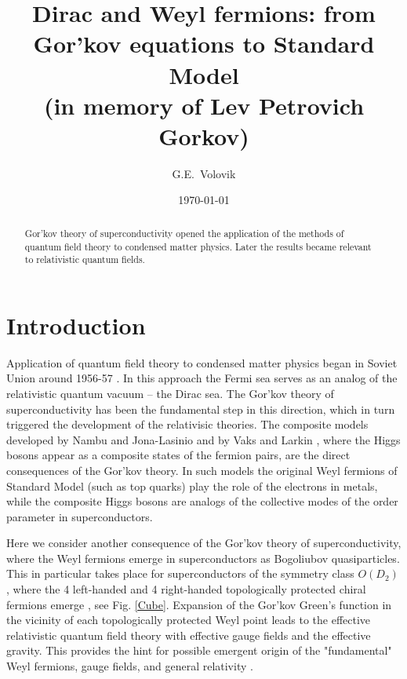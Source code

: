 \documentclass[prb,
superscriptaddress,showpacs,amsmath,amssymb]{revtex4}
\begin{document}
\title{Dirac and Weyl fermions: from Gor'kov equations to Standard Model\\
(in memory of Lev Petrovich Gorkov)}

\author{G.E.~Volovik}


\date{\today}


\begin{abstract}
Gor'kov theory of superconductivity \cite{Gorkov1958} opened the application of the methods of quantum field theory to condensed matter physics. Later the results became relevant to relativistic quantum fields.
\end{abstract} 



\maketitle

 
 \section{Introduction}

Application of quantum field theory to condensed matter physics  began in Soviet Union  around 1956-57
\cite{Gorkov2011}. In this approach the Fermi sea serves as an analog of the relativistic quantum vacuum -- the Dirac sea. The Gor'kov theory of superconductivity  \cite{Gorkov1958} has been the fundamental step in this direction, which in turn  triggered the development of the relativisic theories. The
composite models developed by Nambu and Jona-Lasinio  \cite{Nambu1961} 
and by Vaks and Larkin  \cite{VaksLarkin1961}, where the Higgs bosons appear as a composite states of the fermion pairs, are the direct consequences of the Gor'kov theory. 
In such models the original Weyl fermions of Standard Model (such as top quarks) play the role of the electrons in metals, while the composite Higgs bosons are analogs of the collective modes of the order parameter in superconductors.

Here we consider another consequence of the Gor'kov theory of superconductivity, where the Weyl fermions emerge in superconductors as Bogoliubov quasiparticles. This in particular takes place for superconductors of the symmetry class $O(D_2)$, where the  4 left-handed and 4 right-handed topologically protected chiral fermions emerge \cite{VolovikGorkov1984,VolovikGorkov1985}, see Fig. \ref{Cube}.  Expansion of the Gor'kov Green's function in the vicinity of each topologically protected Weyl point leads to the effective relativistic quantum field theory with effective gauge fields and the effective gravity. This provides the hint for possible emergent origin of the "fundamental" Weyl fermions, gauge fields, and general relativity \cite{FrogNielBook,Horava2005,Volovik2003}. 
\end{document}
